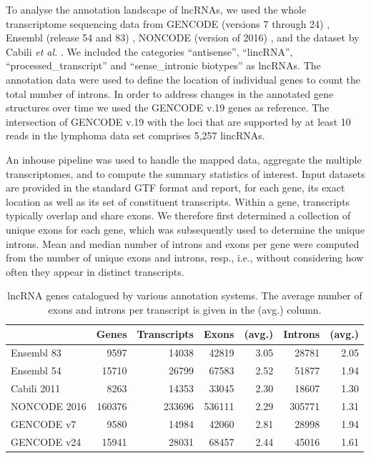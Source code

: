 \documentclass[ncrna,article,submit,moreauthors,pdftex,10pt,a4paper]{mdpi}
\begin{document}
To analyse the annotation landscape of lncRNAs, we used the whole
transcriptome sequencing data from GENCODE (versions 7 through 24)
\cite{harrow2012}, Ensembl (release 54 and 83) \cite{flicek2014}, NONCODE
(version of 2016) \cite{zhao2016}, and the dataset by Cabili \textit{et
  al.}  \cite{cabili2011}. We included the categories ``antisense'',
``lincRNA'', ``processed\_transcript'' and ``sense\_intronic biotypes'' as
lncRNAs.  The annotation data were used to define the location of
individual genes to count the total number of introns. In order to address
changes in the annotated gene structures over time we used the GENCODE v.19
genes as reference. The intersection of GENCODE v.19 with the loci that are
supported by at least 10 reads in the lymphoma data set comprises 5,257
lincRNAs.

An inhouse pipeline was used to handle the mapped data, aggregate the
multiple transcriptomes, and to compute the summary statistics of
interest. Input datasets are provided in the standard GTF format and
report, for each gene, its exact location as well as its set of constituent
transcripts. Within a gene, transcripts typically overlap and share exons.
We therefore first determined a collection of unique exons for each gene,
which was subsequently used to determine the unique introns. Mean and
median number of introns and exons per gene were computed from the number
of unique exons and introns, resp., i.e., without considering how often
they appear in distinct transcripts.

\begin{table}[ht]
  \caption{lncRNA genes catalogued by various annotation systems. The
    average number of exons and introns per transcript is given in the
    (avg.) column.} 
\label{tab:consortia}
\begin{center}\small
\begin{tabular}{|l|rr|rr|rr|}
  \hline
  & Genes & Transcripts & Exons & (avg.) & 
                        Introns & (avg.) \\ 
   \hline
  Ensembl 83   &   9597 &  14038 &  42819 & 3.05 &  28781 & 2.05 \\ 
  Ensembl 54   &  15710 &  26799 &  67583 & 2.52 &  51877 & 1.94 \\ 
  Cabili 2011  &   8263 &  14353 &  33045 & 2.30 &  18607 & 1.30 \\ 
  NONCODE 2016 & 160376 & 233696 & 536111 & 2.29 & 305771 & 1.31 \\ 
  GENCODE v7   &   9580 &  14984 &  42060 & 2.81 &  28998 & 1.94 \\ 
  GENCODE v24  &  15941 &  28031 &  68457 & 2.44 &  45016 & 1.61 \\ 
   \hline
\end{tabular}
\end{center}
\end{table}
\end{document}
